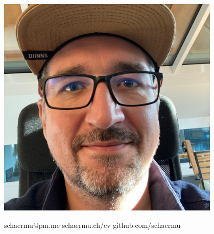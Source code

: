 \documentclass[10pt]{../developercv} %
\begin{document}
\begin{minipage}[t]{0.23\textwidth} %
	\vspace{-\baselineskip} %
	\includegraphics[width=0.8\textwidth]{schaermu_quad.jpg}
\end{minipage}
\hfill %

\vspace{0.75cm} %

\begin{minipage}[t]{1\textwidth} %
	\vspace{-\baselineskip} %

	schaermu@pm.me\hspace{0.2cm}
	schaermu.ch/cv\hspace{0.2cm}
	github.com/schaermu\hspace{0.2cm}
\end{minipage}

\vspace{0.5cm} %

\end{document}
